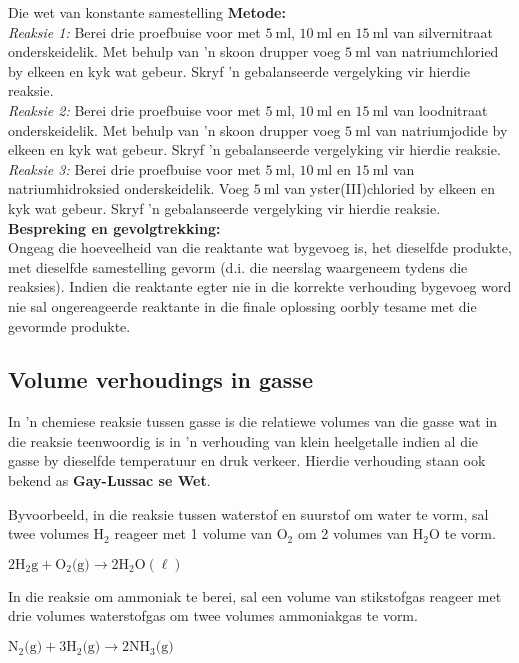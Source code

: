\begin{Investigation}{Die wet van konstante samestelling}
\textbf{Metode:}\\
\textsl{Reaksie 1:} Berei drie proefbuise voor met $5~\text{ml}$, $10~\text{ml}$ en $15~\text{ml}$ van silvernitraat onderskeidelik. Met behulp van 'n skoon drupper voeg $5~\text{ml}$ van natriumchloried by elkeen en kyk wat gebeur. Skryf 'n gebalanseerde vergelyking vir hierdie reaksie.\\
\textsl{Reaksie 2:} Berei drie proefbuise voor met $5~\text{ml}$, $10~\text{ml}$ en $15~\text{ml}$  van loodnitraat onderskeidelik. Met behulp van 'n skoon drupper voeg $5~\text{ml}$ van natriumjodide by elkeen en kyk wat gebeur. Skryf 'n gebalanseerde vergelyking vir hierdie reaksie.\\
\textsl{Reaksie 3:} Berei drie proefbuise voor met $5~\text{ml}$, $10~\text{ml}$ en $15~\text{ml}$  van natriumhidroksied onderskeidelik. Voeg $5~\text{ml}$ van yster(III)chloried by elkeen en kyk wat gebeur. Skryf 'n gebalanseerde vergelyking vir hierdie reaksie. \\
\textbf{Bespreking en gevolgtrekking:} \\
Ongeag die hoeveelheid van die reaktante wat bygevoeg is, het dieselfde produkte, met dieselfde samestelling gevorm (d.i. die neerslag waargeneem tydens die reaksies). Indien die reaktante egter nie in die korrekte verhouding bygevoeg word nie sal ongereageerde reaktante in die finale oplossing oorbly tesame met die gevormde produkte.
\end{Investigation}

    \label{m38711*cid7}
            \subsection*{Volume verhoudings in gasse}
            \nopagebreak
      \label{m38711*id65179}In 'n chemiese reaksie tussen gasse is die relatiewe volumes van die gasse wat in die reaksie teenwoordig is in 'n verhouding van klein heelgetalle indien al die gasse by dieselfde temperatuur en druk verkeer. Hierdie verhouding staan ook bekend as \textbf{Gay-Lussac se Wet}.\par 
      \label{m38711*id65189}Byvoorbeeld, in die reaksie tussen waterstof en suurstof om water te vorm, sal twee volumes $\text{H}{}_{2}$ reageer met 1 volume van $\text{O}_{2}$ om 2 volumes van $\text{H}_{2}\text{O}$ te vorm.\par 
      \label{m38711*id65237}$2\text{H}_{2}\text{g} +\text{O}_{2} \text{(g)} \to 2\text{H}_{2}\text{O} (\ell)$\par 
      \label{m38711*id65282}In die reaksie om ammoniak te berei, sal een volume van stikstofgas reageer met drie volumes waterstofgas om twee volumes ammoniakgas te vorm.\par 
      \label{m38711*id65286}$\text{N}_{2} \text{(g)}+3\text{H}_{2} \text{(g)} \to 2\text{NH}_{3} \text{(g)}$
      \par  
    \label{m38711*cid8}

